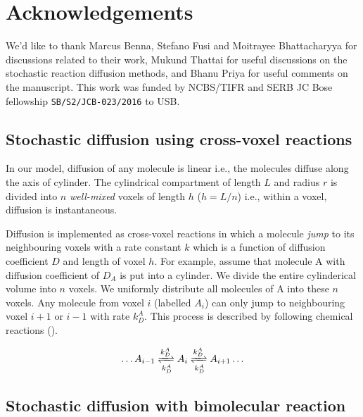 \documentclass[9pt,lineno,doublespacing]{elife}
\begin{document}
{%
\section{Acknowledgements}
We'd like to thank Marcus Benna, Stefano Fusi and Moitrayee Bhattacharyya for
discussions related to their work, Mukund Thattai for useful discussions on the
stochastic reaction diffusion methods, and Bhanu Priya for useful comments on
the manuscript. This work was funded by NCBS/TIFR and SERB JC Bose fellowship
\texttt{SB/S2/JCB-023/2016} to USB.

 

\appendix
\begin{appendixbox}

\subsection*{Stochastic diffusion using cross-voxel reactions}\label{sec:diff_as_gillespie}

In our model, diffusion of any molecule is linear i.e., the molecules diffuse
along the axis of cylinder. The cylindrical compartment of length $L$ and radius $r$
is divided into $n$ \emph{well-mixed} voxels of length $h$ ($h=L/n$) i.e., within
a voxel, diffusion is instantaneous.  

Diffusion is implemented as cross-voxel reactions in which a molecule
\emph{jump} to its neighbouring voxels with a rate constant $k$ which is a
function of diffusion coefficient $D$ and length of voxel $h$. For example,
assume that molecule A with diffusion coefficient of $D_A$ is put into a
cylinder. We divide the entire cylinderical volume into $n$ voxels. We uniformly
distribute all molecules of A into these $n$ voxels. Any molecule from voxel $i$
(labelled $A_i$) can only jump to neighbouring voxel $i+1$ or $i-1$ with rate
$k_D^A$. This process is described by following chemical reactions ().

\begin{equation}
\begin{gathered}
    \ldots A_{i-1} \xrightleftharpoons[k_D^A]{k_D^A} A_{i}
    \xrightleftharpoons[k_D^A]{k_D^A} A_{i+1} \ldots
\end{gathered}
\label{eq:stoch_diff}
\end{equation}


\subsection*{Stochastic diffusion with bimolecular reaction}\label{subsec:rdme}


\end{appendixbox}}
\end{document}
